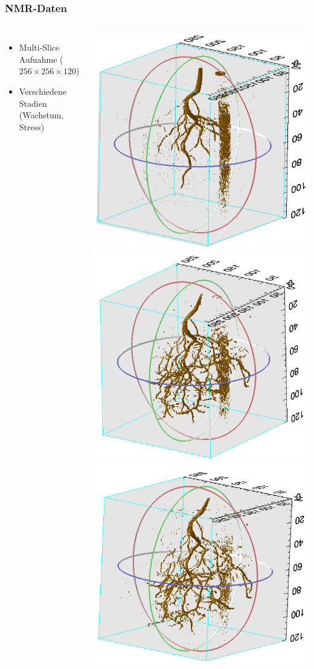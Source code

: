\documentclass[final,ngerman,ignorenonframetext,compress]{beamer}
\begin{document}
\begin{frame}
	\frametitle{NMR-Daten}
	\begin{columns}
		\begin{itemize}
			\item Multi-Slice Aufnahme ($256\times256\times120$)
			\item Verschiedene Stadien (Wachstum, Stress)
		\end{itemize}
		\vspace{1cm}

		\includegraphics[width=.6\linewidth]{img/d1}
		\includegraphics[width=.6\linewidth]{img/d2}\\
		\includegraphics[width=.6\linewidth]{img/d3}
	\end{columns}
\end{frame}
\end{document}
